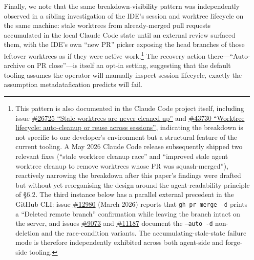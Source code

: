 \documentclass[12pt]{article}
\begin{document}
Finally, we note that the same breakdown-visibility pattern was independently observed in a sibling investigation of the IDE's session and worktree lifecycle on the same machine: stale worktrees from already-merged pull requests accumulated in the local Claude Code state until an external review surfaced them, with the IDE's own ``new PR'' picker exposing the head branches of those leftover worktrees as if they were active work.\footnote{This pattern is also documented in the Claude Code project itself, including issue \href{https://github.com/anthropics/claude-code/issues/26725}{\#26725 ``Stale worktrees are never cleaned up''} and \href{https://github.com/anthropics/claude-code/issues/43730}{\#43730 ``Worktree lifecycle: auto-cleanup or reuse across sessions''}, indicating the breakdown is not specific to one developer's environment but a structural feature of the current tooling. A May 2026 Claude Code release subsequently shipped two relevant fixes (``stale worktree cleanup race'' and ``improved stale agent worktree cleanup to remove worktrees whose PR was squash-merged''), reactively narrowing the breakdown after this paper's findings were drafted but without yet reorganising the design around the agent-readability principle of \S6.2. The third instance below has a parallel external precedent in the GitHub CLI: issue \href{https://github.com/cli/cli/issues/12980}{\#12980} (March 2026) reports that \texttt{gh pr merge -d} prints a ``Deleted remote branch'' confirmation while leaving the branch intact on the server, and issues \href{https://github.com/cli/cli/issues/9073}{\#9073} and \href{https://github.com/cli/cli/issues/11187}{\#11187} document the \texttt{--auto -d} non-deletion and the race-condition variants. The accumulating-stale-state failure mode is therefore independently exhibited across both agent-side and forge-side tooling.} The recovery action there---``Auto-archive on PR close''---is itself an opt-in setting, suggesting that the default tooling assumes the operator will manually inspect session lifecycle, exactly the assumption metadatafication predicts will fail.
\end{document}
